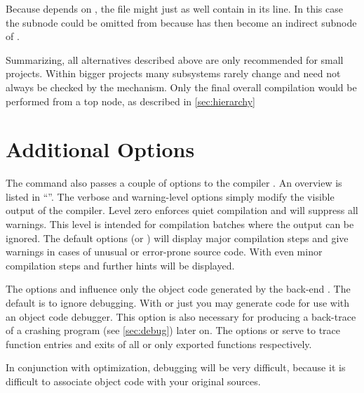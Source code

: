 Because  depends on , the file  might
just as well contain  in its  line. In this case the
subnode  could be omitted from 
 because  has then become an indirect subnode of
. 

Summarizing, all alternatives described above are only recommended for small
projects. Within bigger projects many subsystems rarely change and need not
always be checked by the  mechanism. Only the final
overall compilation would be performed from a top node, as
described in \ref{sec:hierarchy}

\section{Additional Options}
\label{sec:comp.add}

The  command also passes a couple of options to the \opal{} compiler
. An overview is listed in ``''. The
verbose and warning-level options simply modify the visible output of the
compiler. Level zero  enforces quiet compilation and will
suppress all warnings. This level is intended for compilation batches where 
the output can be ignored. The default options  (or )
will display major compilation steps and give warnings in cases of unusual or
error-prone \opal{} source code. With  even minor compilation
steps and further hints will be displayed.

The options  and  influence only the object code
generated by the back-end . The default is to ignore
debugging. With  or just  you may generate code for
use with an object code debugger. This option is also necessary for producing
a back-trace
of a crashing program (see \ref{sec:debug}) later on. The options  or
 serve to trace function 
entries and exits of all or only exported functions respectively.

In conjunction with optimization, debugging will be very difficult, because it is
difficult to associate object code with your original \opal{} sources. 


